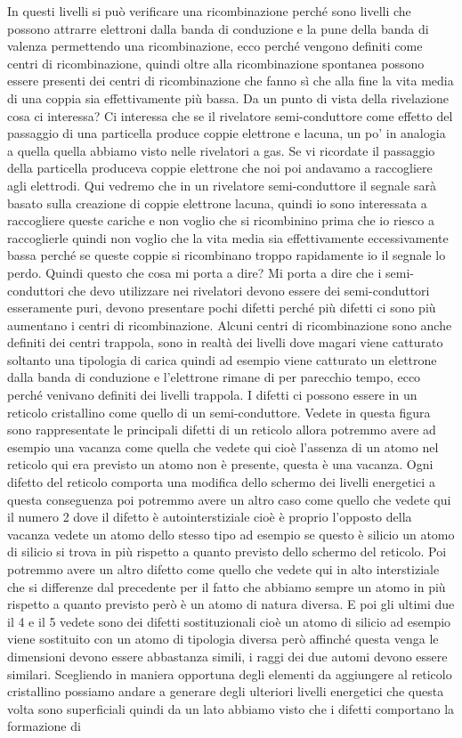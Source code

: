 In questi livelli si può verificare una ricombinazione perché sono livelli che possono attrarre elettroni dalla banda di conduzione e la pune della banda di valenza permettendo una ricombinazione, ecco perché vengono definiti come centri di ricombinazione, quindi oltre alla ricombinazione spontanea possono essere presenti dei centri di ricombinazione che fanno sì che alla fine la vita media di una coppia sia effettivamente più bassa. Da un punto di vista della rivelazione cosa ci interessa? Ci interessa che se il rivelatore semi-conduttore come effetto del passaggio di una particella produce coppie elettrone e lacuna, un po' in analogia a quella quella abbiamo visto nelle rivelatori a gas. Se vi ricordate il passaggio della particella produceva coppie elettrone che noi poi andavamo a raccogliere agli elettrodi. Qui vedremo che in un rivelatore semi-conduttore il segnale sarà basato sulla creazione di coppie elettrone lacuna, quindi io sono interessata a raccogliere queste cariche e non voglio che si ricombinino prima che io riesco a raccoglierle quindi non voglio che la vita media sia effettivamente eccessivamente bassa perché se queste coppie si ricombinano troppo rapidamente io il segnale lo perdo. Quindi questo che cosa mi porta a dire? Mi porta a dire che i semi-conduttori che devo utilizzare nei rivelatori devono essere dei semi-conduttori esseramente puri, devono presentare pochi difetti perché più difetti ci sono più aumentano i centri di ricombinazione. Alcuni centri di ricombinazione sono anche definiti dei centri trappola, sono in realtà dei livelli dove magari viene catturato soltanto una tipologia di carica quindi ad esempio viene catturato un elettrone dalla banda di conduzione e l'elettrone rimane di per parecchio tempo, ecco perché venivano definiti dei livelli trappola. I difetti ci possono essere in un reticolo cristallino come quello di un semi-conduttore. Vedete in questa figura sono rappresentate le principali difetti di un reticolo allora potremmo avere ad esempio una vacanza come quella che vedete qui cioè l'assenza di un atomo nel reticolo qui era previsto un atomo non è presente, questa è una vacanza. Ogni difetto del reticolo comporta una modifica dello schermo dei livelli energetici a questa conseguenza poi potremmo avere un altro caso come quello che vedete qui il numero 2 dove il difetto è autointerstiziale cioè è proprio l'opposto della vacanza vedete un atomo dello stesso tipo ad esempio se questo è silicio un atomo di silicio si trova in più rispetto a quanto previsto dello schermo del reticolo. Poi potremmo avere un altro difetto come quello che vedete qui in alto interstiziale che si differenze dal precedente per il fatto che abbiamo sempre un atomo in più rispetto a quanto previsto però è un atomo di natura diversa. E poi gli ultimi due il 4 e il 5 vedete sono dei difetti sostituzionali cioè un atomo di silicio ad esempio viene sostituito con un atomo di tipologia diversa però affinché questa venga le dimensioni devono essere abbastanza simili, i raggi dei due automi devono essere similari. Scegliendo in maniera opportuna degli elementi da aggiungere al reticolo cristallino possiamo andare a generare degli ulteriori livelli energetici che questa volta sono superficiali quindi da un lato abbiamo visto che i difetti comportano la formazione di 